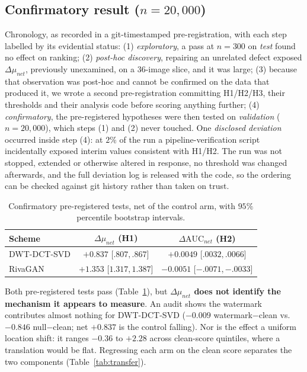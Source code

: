 \documentclass[journal]{IEEEtran}
\begin{document}
\subsection{Confirmatory result ($n = 20{,}000$)}
\label{sec:confirm}

Chronology, as recorded in a git-timestamped pre-registration, with each step
labelled by its evidential status: (1) \emph{exploratory}, a pass at
$n{=}300$ on \emph{test} found no effect on ranking; (2) \emph{post-hoc
discovery}, repairing an unrelated defect exposed $\Delta\mu_{net}$,
previously unexamined, on a 36-image slice, and it was large; (3) because that
observation was post-hoc and cannot be confirmed on the data that produced it,
we wrote a second pre-registration committing H1/H2/H3, their thresholds and
their analysis code before scoring anything further; (4) \emph{confirmatory},
the pre-registered hypotheses were then tested on \emph{validation}
($n{=}20{,}000$), which steps (1) and (2) never touched. One \emph{disclosed
deviation} occurred inside step (4): at $2\%$ of the run a
pipeline-verification script incidentally exposed interim values consistent
with H1/H2. The run was not stopped, extended or otherwise altered in
response, no threshold was changed afterwards, and the full deviation log is
released with the code, so the ordering can be checked against git history
rather than taken on trust.

\begin{table}[t]
\centering
\caption{Confirmatory pre-registered tests, net of the control arm, with
$95\%$ percentile bootstrap intervals.}
\label{tab:confirm}
\footnotesize
\setlength{\tabcolsep}{3pt}
\begin{tabular}{lcc}
\toprule
Scheme & $\Delta\mu_{net}$ (H1) & $\Delta\mathrm{AUC}_{net}$ (H2) \\
\midrule
DWT-DCT-SVD & $\mathbf{+0.837}$ [$.807,.867$] & $+0.0049$ [$.0032,.0066$] \\
RivaGAN & $\mathbf{+1.353}$ [$1.317,1.387$] & $-0.0051$ [$-.0071,-.0033$] \\
\bottomrule
\end{tabular}
\end{table}

Both pre-registered tests pass (Table~\ref{tab:confirm}), but
\textbf{$\Delta\mu_{net}$ does not identify the mechanism it appears to
measure}. An audit shows the watermark contributes almost nothing for
DWT-DCT-SVD ($-0.009$ watermark$-$clean vs.\ $-0.846$ null$-$clean; net
$+0.837$ is the control falling). Nor is the effect a uniform location shift:
it ranges $-0.36$ to $+2.28$ across clean-score quintiles, where a
translation would be flat. Regressing each arm on the clean score separates
the two components (Table~\ref{tab:transfer}).
\end{document}
